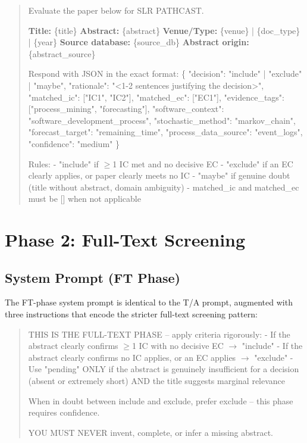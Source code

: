 \begin{quote}
\small\ttfamily
Evaluate the paper below for SLR PATHCAST.

\textbf{Title:} \{title\}
\textbf{Abstract:} \{abstract\}
\textbf{Venue/Type:} \{venue\} | \{doc\_type\} | \{year\}
\textbf{Source database:} \{source\_db\}
\textbf{Abstract origin:} \{abstract\_source\}

Respond with JSON in the exact format:
\{
  "decision": "include" | "exclude" | "maybe",
  "rationale": "<1-2 sentences justifying the decision>",
  "matched\_ic": ["IC1", "IC2"],
  "matched\_ec": ["EC1"],
  "evidence\_tags": ["process\_mining", "forecasting"],
  "software\_context": "software\_development\_process",
  "stochastic\_method": "markov\_chain",
  "forecast\_target": "remaining\_time",
  "process\_data\_source": "event\_logs",
  "confidence": "medium"
\}

Rules:
- "include" if $\geq$1 IC met and no decisive EC
- "exclude" if an EC clearly applies, or paper clearly meets no IC
- "maybe" if genuine doubt (title without abstract, domain ambiguity)
- matched\_ic and matched\_ec must be [] when not applicable
\end{quote}

\section{Phase 2: Full-Text Screening}
\label{app:slr-ft-prompt}

\subsection*{System Prompt (FT Phase)}

The FT-phase system prompt is identical to the T/A prompt, augmented with
three instructions that encode the stricter full-text screening pattern:

\begin{quote}
\small\ttfamily
THIS IS THE FULL-TEXT PHASE -- apply criteria rigorously:
- If the abstract clearly confirms $\geq$1 IC with no decisive EC
  $\rightarrow$ "include"
- If the abstract clearly confirms no IC applies, or an EC applies
  $\rightarrow$ "exclude"
- Use "pending" ONLY if the abstract is genuinely insufficient for
  a decision (absent or extremely short) AND the title suggests
  marginal relevance

When in doubt between include and exclude, prefer exclude -- this
phase requires confidence.

YOU MUST NEVER invent, complete, or infer a missing abstract.
\end{quote}

